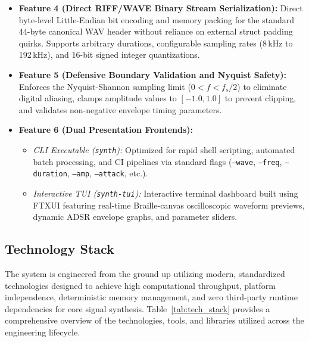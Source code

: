 \documentclass[12pt,a4paper,oneside]{book}
\begin{document}
\begin{itemize}
    \item \textbf{Feature 4 (Direct RIFF/WAVE Binary Stream Serialization):} Direct byte-level Little-Endian bit encoding and memory packing for the standard 44-byte canonical WAV header without reliance on external struct padding quirks. Supports arbitrary durations, configurable sampling rates (8\,kHz to 192\,kHz), and 16-bit signed integer quantizations.

    \item \textbf{Feature 5 (Defensive Boundary Validation and Nyquist Safety):} Enforces the Nyquist-Shannon sampling limit ($0 < f < f_s / 2$) to eliminate digital aliasing, clamps amplitude values to $[-1.0, 1.0]$ to prevent clipping, and validates non-negative envelope timing parameters.

    \item \textbf{Feature 6 (Dual Presentation Frontends):}
    \begin{itemize}
        \item \textit{CLI Executable (\texttt{synth}):} Optimized for rapid shell scripting, automated batch processing, and CI pipelines via standard flags (\texttt{--wave}, \texttt{--freq}, \texttt{--duration}, \texttt{--amp}, \texttt{--attack}, etc.).
        \item \textit{Interactive TUI (\texttt{synth-tui}):} Interactive terminal dashboard built using FTXUI featuring real-time Braille-canvas oscilloscopic waveform previews, dynamic ADSR envelope graphs, and parameter sliders.
    \end{itemize}
\end{itemize}

\subsection{Technology Stack}
The system is engineered from the ground up utilizing modern, standardized technologies designed to achieve high computational throughput, platform independence, deterministic memory management, and zero third-party runtime dependencies for core signal synthesis. Table~\ref{tab:tech_stack} provides a comprehensive overview of the technologies, tools, and libraries utilized across the engineering lifecycle.
\end{document}
